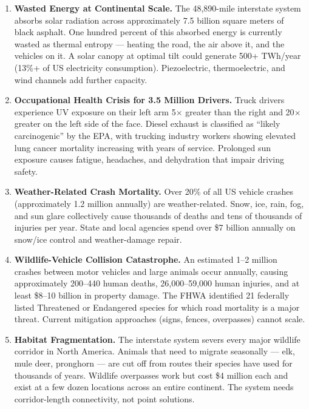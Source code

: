 \documentclass[11pt,letterpaper]{article}
\begin{document}
\begin{enumerate}[leftmargin=2em]
  \item \textbf{Wasted Energy at Continental Scale.} The 48,890-mile interstate system absorbs solar radiation across approximately 7.5 billion square meters of black asphalt. One hundred percent of this absorbed energy is currently wasted as thermal entropy --- heating the road, the air above it, and the vehicles on it. A solar canopy at optimal tilt could generate 500+ TWh/year (13\%+ of US electricity consumption). Piezoelectric, thermoelectric, and wind channels add further capacity.

  \item \textbf{Occupational Health Crisis for 3.5 Million Drivers.} Truck drivers experience UV exposure on their left arm 5$\times$ greater than the right and 20$\times$ greater on the left side of the face. Diesel exhaust is classified as ``likely carcinogenic'' by the EPA, with trucking industry workers showing elevated lung cancer mortality increasing with years of service. Prolonged sun exposure causes fatigue, headaches, and dehydration that impair driving safety.

  \item \textbf{Weather-Related Crash Mortality.} Over 20\% of all US vehicle crashes (approximately 1.2 million annually) are weather-related. Snow, ice, rain, fog, and sun glare collectively cause thousands of deaths and tens of thousands of injuries per year. State and local agencies spend over \$7 billion annually on snow/ice control and weather-damage repair.

  \item \textbf{Wildlife-Vehicle Collision Catastrophe.} An estimated 1--2 million crashes between motor vehicles and large animals occur annually, causing approximately 200--440 human deaths, 26,000--59,000 human injuries, and at least \$8--10 billion in property damage. The FHWA identified 21 federally listed Threatened or Endangered species for which road mortality is a major threat. Current mitigation approaches (signs, fences, overpasses) cannot scale.

  \item \textbf{Habitat Fragmentation.} The interstate system severs every major wildlife corridor in North America. Animals that need to migrate seasonally --- elk, mule deer, pronghorn --- are cut off from routes their species have used for thousands of years. Wildlife overpasses work but cost \$4 million each and exist at a few dozen locations across an entire continent. The system needs corridor-length connectivity, not point solutions.
\end{enumerate}
\end{document}
